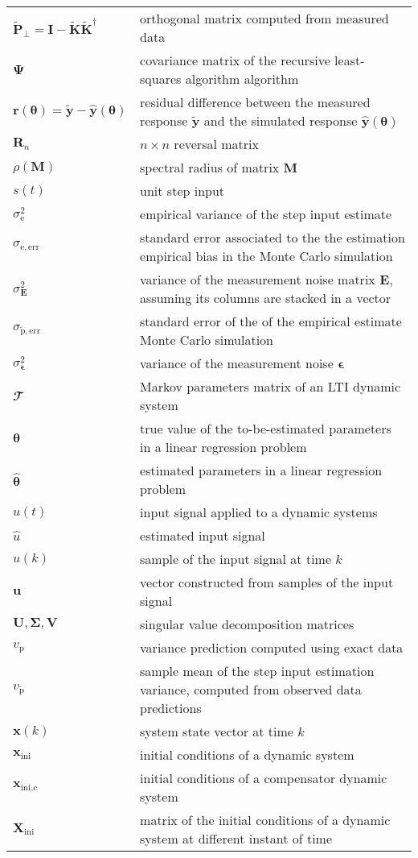 \begin{longtable}[c]{>{\raggedleft}p{}>{\raggedright}p{}}
$\widetilde{\mathbf{P}}_\perp = \mathbf{I} - \widetilde{\mathbf{K}} \widetilde{\mathbf{K}}^\dagger$  &  orthogonal matrix computed from measured data  \tabularnewline
$\bm{\Psi}$  &  covariance matrix of the recursive least-squares algorithm algorithm  \tabularnewline
$\mathbf{r}(\bm{\theta}) = \widetilde{\mathbf{y}} - \widehat{\mathbf{y}}(\bm{\theta})$  &  residual difference between the measured response $\widetilde{\mathbf{y}}$ and the simulated response $\widehat{\mathbf{y}}(\bm{\theta})$  \tabularnewline
$\mathbf{R}_n$  &  $n \times n$ reversal matrix   \tabularnewline
$\rho(\mathbf{M})$  &   spectral radius of matrix $\mathbf{M}$ \tabularnewline
$s(t)$ &  unit step input \tabularnewline
$\sigma_\mathrm{e}^2$  &  empirical variance of the step input estimate  \tabularnewline
$\sigma_\mathrm{e,err}$  &  standard error associated to the the estimation empirical bias in the Monte Carlo simulation  \tabularnewline
$\sigma_{\mathbf{E}}^2$  &    variance of the measurement noise matrix $\mathbf{E}$, assuming its columns are stacked in a vector  \tabularnewline
$\sigma_{\widetilde{\mathrm{p}}, \mathrm{err}}$  &  standard error of the of the empirical estimate Monte Carlo simulation  \tabularnewline
$\sigma_{\bm{\epsilon}}^2$  &  variance of the measurement noise $\bm{\epsilon}$ \tabularnewline
$\mathbfcal{T}$  &  Markov parameters matrix of an LTI dynamic system  \tabularnewline
$\bm{\theta}$  &   true value of the to-be-estimated parameters in a linear regression problem  \tabularnewline
$\widehat{\bm{\theta}}$  &   estimated parameters in a linear regression problem  \tabularnewline
$u(t)$ &   input signal applied to a dynamic systems \tabularnewline
$\widehat{u}$ &   estimated input signal \tabularnewline
$u(k)$ &  sample of the input signal at time $k$  \tabularnewline
$\mathbf{u}$  &  vector constructed from samples of the input signal  \tabularnewline
$\mathbf{U}, \bm{\Sigma}, \mathbf{V}$  &    singular value decomposition matrices  \tabularnewline
$v_{{\mathrm{p}}}$  &  variance prediction computed using exact data   \tabularnewline
$v_{\widetilde{\mathrm{p}}}$  &  sample mean of the step input estimation variance, computed  from observed data predictions   \tabularnewline
$\mathbf{x}(k)$ &   system state vector at time $k$ \tabularnewline
$\mathbf{x}_{\text{ini}}$  &  initial conditions of a dynamic system  \tabularnewline
$\mathbf{x}_{\text{ini,c}}$  &  initial conditions of a compensator dynamic system  \tabularnewline
$\mathbf{X}_{\text{ini}}$  &  matrix of the initial conditions of a dynamic system at different instant of time  \tabularnewline

\end{longtable}
